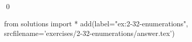 
\begin{ex}
  \label{ex:2-32-enumerations}
  
  \qed
\end{ex}
\begin{python0}
from solutions import *
add(label="ex:2-32-enumerations",
    srcfilename='exercises/2-32-enumerations/answer.tex')
\end{python0}
